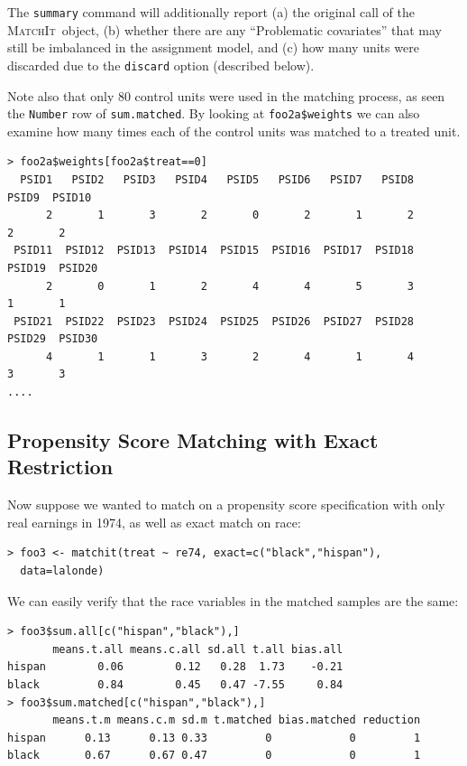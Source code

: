 \documentclass[oneside,letterpaper,titlepage]{article}
\newcommand{\MatchIt}{\textsc{MatchIt}}
\begin{document}
The \texttt{summary} command will additionally report (a) the original
call of the \MatchIt\ object, (b) whether there are any ``Problematic
covariates'' that may still be imbalanced in the assignment model, and
(c) how many units were discarded due to the \texttt{discard} option
(described below). 

Note also that only 80 control units were used in the matching
process, as seen the \texttt{Number} row of \texttt{sum.matched}. 
By looking at \texttt{foo2a\$weights} we can also examine how many times each of the control units was
matched to a treated unit.

\begin{footnotesize}
\begin{verbatim}
> foo2a$weights[foo2a$treat==0]
  PSID1   PSID2   PSID3   PSID4   PSID5   PSID6   PSID7   PSID8   PSID9  PSID10 
      2       1       3       2       0       2       1       2       2       2 
 PSID11  PSID12  PSID13  PSID14  PSID15  PSID16  PSID17  PSID18  PSID19  PSID20 
      2       0       1       2       4       4       5       3       1       1 
 PSID21  PSID22  PSID23  PSID24  PSID25  PSID26  PSID27  PSID28  PSID29  PSID30 
      4       1       1       3       2       4       1       4       3       3 
....
\end{verbatim}
\end{footnotesize}

\subsection{Propensity Score Matching with Exact Restriction}

Now suppose we wanted to match on a propensity score specification with only real earnings in 1974, 
as well as exact match on race:

\begin{verbatim}
> foo3 <- matchit(treat ~ re74, exact=c("black","hispan"),
  data=lalonde)
\end{verbatim}

We can easily verify that the race variables in the matched samples
are the same:

\begin{verbatim}
> foo3$sum.all[c("hispan","black"),]
       means.t.all means.c.all sd.all t.all bias.all
hispan        0.06        0.12   0.28  1.73    -0.21
black         0.84        0.45   0.47 -7.55     0.84
> foo3$sum.matched[c("hispan","black"),]
       means.t.m means.c.m sd.m t.matched bias.matched reduction
hispan      0.13      0.13 0.33         0            0         1
black       0.67      0.67 0.47         0            0         1
\end{verbatim}
\end{document}
